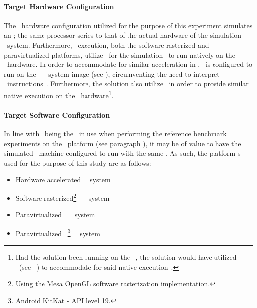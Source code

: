 \paragraph{Target Hardware Configuration}
\label{par:experimentalmethodology_platformconfiguration:targethardwareconfiguration}
The \dvttermsimics\ hardware configuration utilized for the purpose of this experiment simulates an \dvttermintelcoreiseven ; the same processor series to that of the actual hardware of the simulation \dvttermhost\ system.
Furthermore, \dvttermsimics\ execution, both the software rasterized and paravirtualized platforms, utilize \dvttermkvm\ for the simulation \dvttermtarget\ to run natively on the \dvttermhost\ hardware.
In order to accommodate for similar acceleration in \dvttermqemu , \dvttermandroid\ is configured to run on the \dvttermintel\ \dvttermandroid\ \dvttermxeightysix\ system image (see ), circumventing the need to interpret \dvttermarm\ instructions~.
Furthermore, the solution also utilize \dvttermkvm\ in order to provide similar native execution on the \dvttermhost\ hardware\footnote{Had the solution been running on the \dvttermwindows\ \dvttermos , the solution would have utilized \dvttermhaxm\ (see ~) to accommodate for said native execution~.}.

\paragraph{Target Software Configuration}
\label{par:experimentalmethodology_platformconfiguration_targetsoftwareconfiguration}
In line with \dvttermfedora\ being the \dvttermos\ in use when performing the reference benchmark experiments on the \dvttermhost\ platform (see paragraph ), it may be of value to have the simulated \dvttermtarget\ machine configured to run with the same \dvttermos .
As such, the platform \dvttermos s used for the purpose of this study are as follows:
\begin{itemize}[noitemsep]
	\item Hardware accelerated \dvttermfedora\ \dvttermhost\ system
	\item Software rasterized\footnote{Using the Mesa OpenGL software rasterization implementation.} \dvttermfedora\ \dvttermsimics\ \dvttermtarget\ system
	\item Paravirtualized \dvttermfedora\ \dvttermsimics\ \dvttermtarget\ system
	\item Paravirtualized \dvttermandroid\ \footnote{Android KitKat - API level 19.} \dvttermqemu\ \dvttermtarget\ system
\end{itemize}

